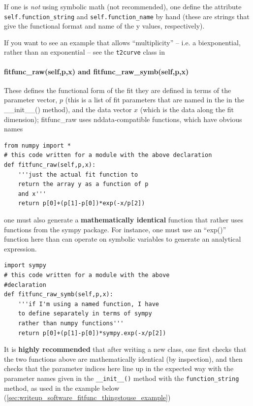 If one is {\it not} using symbolic math (not recommended),
    one define the attribute {\tt self.function\_string} and {\tt self.function\_name}
    by hand (these are strings that give the functional format and name of the y values,
    respectively).

If you want to see an example that allows ``multiplicity'' -- i.e. a
    biexponential, rather than an exponential -- see the \texttt{t2curve} class
    in 
\paragraph{fitfunc\_raw(self,p,x) and fitfunc\_raw\_symb(self,p,x)}
These defines the functional form of the fit
    they are defined in terms of the parameter vector, $p$
    (this is a list of fit parameters that are named in
    the in the \_\_init\_\_() method),
    and the data vector $x$ (which is the data along
    the fit dimension);
fitfunc\_raw uses nddata-compatible functions, which have obvious names
\begin{lstlisting}
from numpy import *
# this code written for a module with the above declaration
def fitfunc_raw(self,p,x):
    '''just the actual fit function to
    return the array y as a function of p
    and x'''
    return p[0]+(p[1]-p[0])*exp(-x/p[2])
\end{lstlisting}
one must also generate a {\bf mathematically identical}
    function that rather uses functions from the sympy package.
For instance, one must use an ``exp()'' function here
    than can operate on symbolic variables to generate
    an analytical expression.
\begin{lstlisting}
import sympy
# this code written for a module with the above
#declaration
def fitfunc_raw_symb(self,p,x):
    '''if I'm using a named function, I have
    to define separately in terms of sympy
    rather than numpy functions'''
    return p[0]+(p[1]-p[0])*sympy.exp(-x/p[2])
\end{lstlisting}
It is {\bf highly recommended} that after writing a new class,
    one first checks that the two functions above are mathematically identical (by inspection),
    and then checks that the parameter indices here
    line up in the expected way with the parameter
    names given in the {\tt \_\_init\_\_()} method
    with the {\tt function\_string} method, as used in the example
    below (\ref{sec:writeup_software_fitfunc_thingstouse_example})
